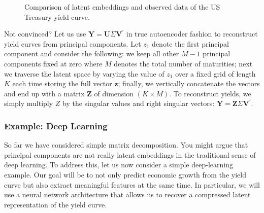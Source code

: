 \documentclass{article}
\theoremstyle{plain}
\theoremstyle{definition}
\theoremstyle{remark}
\begin{document}
\begin{figure}


\caption{\label{fig-pca}Comparison of latent embeddings and observed
data of the US Treasury yield curve.}

\end{figure}%

Not convinced? Let us use
\(\mathbf{Y}=\mathbf{U}\Sigma\mathbf{V}^{\prime}\) in true autoencoder
fashion to reconstruct yield curves from principal components. Let
\(z_1\) denote the first principal component and consider the following:
we keep all other \(M-1\) principal components fixed at zero where \(M\)
denotes the total number of maturities; next we traverse the latent
space by varying the value of \(z_1\) over a fixed grid of length \(K\)
each time storing the full vector \(\mathbf{z}\); finally, we vertically
concatenate the vectors and end up with a matrix \(\mathbf{Z}\) of
dimension \((K \times M)\). To reconstruct yields, we simply multiply
\(Z\) by the singular values and right singular vectors:
\(\mathbf{Y}=\mathbf{Z}\Sigma\mathbf{V}^{\prime}\).

\subsubsection{Example: Deep Learning}\label{example-deep-learning}

So far we have considered simple matrix decomposition. You might argue
that principal components are not really latent embeddings in the
traditional sense of deep learning. To address this, let us now consider
a simple deep-learning example. Our goal will be to not only predict
economic growth from the yield curve but also extract meaningful
features at the same time. In particular, we will use a neural network
architecture that allows us to recover a compressed latent
representation of the yield curve.
\end{document}
